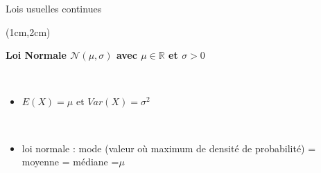 \documentclass{beamer}
\begin{document}
\begin{frame}{Lois usuelles continues}
\begin{textblock*}{\textwidth}(1cm,2cm)

\begin{center}{\bf \Large Loi Normale $\mathcal{N}(\mu,\sigma)$ avec $\mu\in \mathbb{R}$ et $\sigma>0$} \end{center}

\

\begin{itemize}
\item  $E(X)=\mu$ et $Var(X)=\sigma^2$

\

\item loi normale :  mode (valeur où maximum de densité de probabilité) = moyenne = médiane =$\mu$
\end{itemize}


 


\end{textblock*}

\end{frame}

\end{document}
